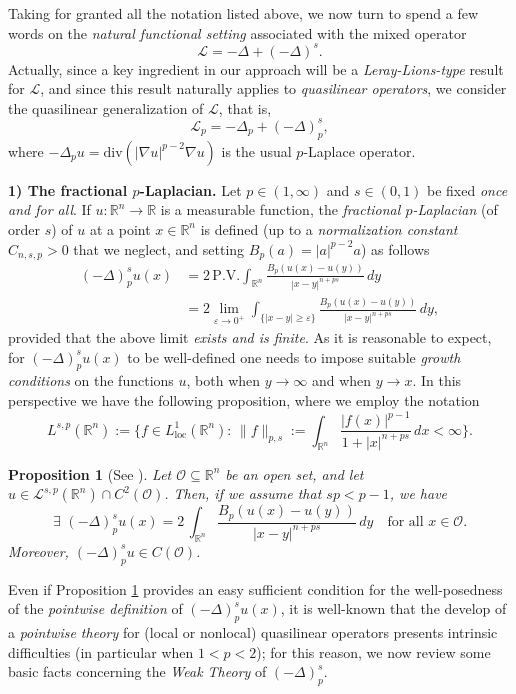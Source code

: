 \documentclass[11pt,a4paper]{amsart}
\def \R {\mathbb{R}}
\def \LL {\mathcal{L}}
\def \Oo {\mathcal{O}}
\theoremstyle{definition}
\theoremstyle{plain}
\newtheorem{proposition}[definition]{Proposition}
\numberwithin{equation}{section}
\begin{document}
 \noindent Taking for granted all the notation listed above, we now turn to spend a few words on the \emph{natural functional setting} associated with the mixed operator
 $$\mathcal{L} = -\Delta+(-\Delta)^s.$$
 Actually, since a key ingredient in our approach will be a \emph{Leray-Lions-type} result for $\mathcal{L}$, and since this result naturally applies
 to \emph{quasilinear operators}, we consider the quasilinear
 generalization of $\mathcal{L}$, that is,
 $$\mathcal{L}_{p} = -\Delta_p+(-\Delta)_p^s,$$
 where $-\Delta_p  u = \mathrm{div}(|\nabla u|^{p-2}\nabla u)$ is the usual $p$-Laplace operator.
 \bigskip
 
 \noindent\textbf{1) The fractional $p$-Laplacian.} Let $p\in(1,\infty)$ and $s\in (0,1)$ be fixed
 \emph{once and for all}. If $u:\R^n\to\R$ is a measurable function, the \emph{fractional $p$-La\-pla\-cian} (of order $s$) of $u$
at a point $x\in\R^n$ is defined (up to a
\emph{nor\-ma\-lization constant} $C_{n,s,p} > 0$ that we neglect, and setting $B_p(a) = |a|^{p-2}a$) as follows
\begin{align*}
 (-\Delta)_p^s u(x) & = 2\,\mathrm{P.V.}\int_{\R^n}\frac{B_p(u(x)-u(y))}{|x-y|^{n+ps}}\,dy\\
 & = 2 \lim_{\varepsilon\to 0^+}\int_{\{|x-y|\geq\varepsilon\}}
 \frac{B_p(u(x)-u(y))}{|x-y|^{n+ps}}\,dy,
\end{align*}
provided that the above limit \emph{exists and is finite}.
As it is reasonable to expect, for $(-\Delta)_p^s u(x)$ to be well-defined one needs
to impose suitable \emph{growth conditions} on the functions $u$, both when $y\to\infty$ and
when $y\to x$. 
In this perspective we have the following
 proposition, where we employ the notation
\begin{equation}\label{eq:spaceL1s}
 {L}^{s,p}(\R^n) := 
 \Big\{f\in L^1_{\mathrm{loc}}(\R^n):\,\|f\|_{p,s} := \int_{\R^n}\frac{|f(x)|^{p-1}}
  {1+|x|^{n+ps}}\,dx<\infty\Big\}.
\end{equation}
\begin{proposition}[{See \cite[Lemmas 3.6 and 3.8]{KKL}}] \label{prop:welldefDeltas}
Let $\Oo\subseteq\R^n$ be an open set, and
 let $u\in\LL^{s,p}(\R^n)\cap C^{2}(\Oo)$.
 Then, if we assume that $sp<p-1$, we have
 $$\exists\,\,(-\Delta)_p^s u(x) = 2\,\int_{\R^n}\frac{B_p(u(x)-u(y))}{|x-y|^{n+ps}}\,dy\quad
 \text{for all $x\in\Oo$}. $$
Moreover, $(-\Delta)_p^su\in C(\Oo)$.
\end{proposition}
Even if Proposition \ref{prop:welldefDeltas} provides an easy
sufficient condition for the well-posed\-ness of the \emph{pointwise definition}
of $(-\Delta)^s_p u(x)$, it is well-known
that the develop of a \emph{pointwise theory} for (local or nonlocal)
quasilinear operators presents intrinsic difficulties
(in particular when $1<p<2$); for this reason,
we now review some basic
facts concerning the \emph{Weak Theory} of $(-\Delta)_p^s$.
\vspace*{0.1cm}
\end{document}
